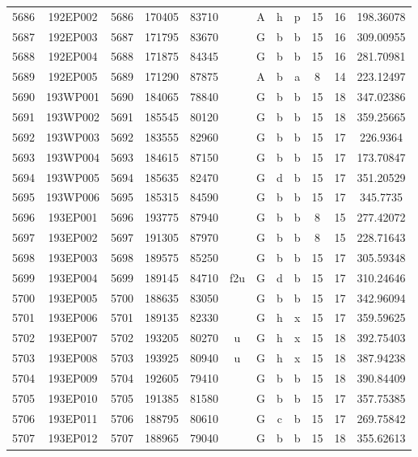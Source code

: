 \begin{tabular}{|*{12}{c|}}
5686 & 192EP002 & 5686 & 170405 & 83710 &  & A & h & p & 15 & 16 & 198.36078 \\ 
5687 & 192EP003 & 5687 & 171795 & 83670 &  & G & b & b & 15 & 16 & 309.00955 \\ 
5688 & 192EP004 & 5688 & 171875 & 84345 &  & G & b & b & 15 & 16 & 281.70981 \\ 
5689 & 192EP005 & 5689 & 171290 & 87875 &  & A & b & a & 8 & 14 & 223.12497 \\ 
5690 & 193WP001 & 5690 & 184065 & 78840 &  & G & b & b & 15 & 18 & 347.02386 \\ 
5691 & 193WP002 & 5691 & 185545 & 80120 &  & G & b & b & 15 & 18 & 359.25665 \\ 
5692 & 193WP003 & 5692 & 183555 & 82960 &  & G & b & b & 15 & 17 & 226.9364 \\ 
5693 & 193WP004 & 5693 & 184615 & 87150 &  & G & b & b & 15 & 17 & 173.70847 \\ 
5694 & 193WP005 & 5694 & 185635 & 82470 &  & G & d & b & 15 & 17 & 351.20529 \\ 
5695 & 193WP006 & 5695 & 185315 & 84590 &  & G & b & b & 15 & 17 & 345.7735 \\ 
5696 & 193EP001 & 5696 & 193775 & 87940 &  & G & b & b & 8 & 15 & 277.42072 \\ 
5697 & 193EP002 & 5697 & 191305 & 87970 &  & G & b & b & 8 & 15 & 228.71643 \\ 
5698 & 193EP003 & 5698 & 189575 & 85250 &  & G & b & b & 15 & 17 & 305.59348 \\ 
5699 & 193EP004 & 5699 & 189145 & 84710 & f2u & G & d & b & 15 & 17 & 310.24646 \\ 
5700 & 193EP005 & 5700 & 188635 & 83050 &  & G & b & b & 15 & 17 & 342.96094 \\ 
5701 & 193EP006 & 5701 & 189135 & 82330 &  & G & h & x & 15 & 17 & 359.59625 \\ 
5702 & 193EP007 & 5702 & 193205 & 80270 & u & G & h & x & 15 & 18 & 392.75403 \\ 
5703 & 193EP008 & 5703 & 193925 & 80940 & u & G & h & x & 15 & 18 & 387.94238 \\ 
5704 & 193EP009 & 5704 & 192605 & 79410 &  & G & b & b & 15 & 18 & 390.84409 \\ 
5705 & 193EP010 & 5705 & 191385 & 81580 &  & G & b & b & 15 & 17 & 357.75385 \\ 
5706 & 193EP011 & 5706 & 188795 & 80610 &  & G & c & b & 15 & 17 & 269.75842 \\ 
5707 & 193EP012 & 5707 & 188965 & 79040 &  & G & b & b & 15 & 18 & 355.62613 \\ 

\end{tabular}
